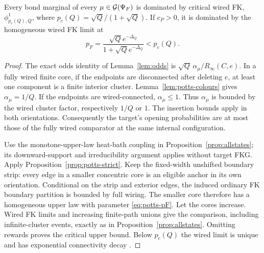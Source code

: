 \begin{proposition}\label{prop:potts-allstates}
Every bond marginal of every $\mu\in\mathcal G(\Psi_F)$ is dominated by critical wired FK, $\phi^1_{p_c(Q),Q}$, where $p_c(Q)=\sqrt Q/(1+\sqrt Q)$. If $c_P>0$, it is dominated by the homogeneous wired FK limit at
\begin{equation}\label{eq:potts-pF}
 p_F=\frac{\sqrt Q e^{-\Delta_Q}}{1+\sqrt Q e^{-\Delta_Q}}<p_c(Q).
\end{equation}
\end{proposition}
\begin{proof}
The exact odds identity of Lemma~\ref{lem:odds} is
$\sqrt Q\,\alpha_\mu/R_\infty(C,e)$.
In a fully wired finite core, if the endpoints are disconnected after deleting $e$, at least one component is a finite interior cluster. Lemma~\ref{lem:potts-colours} gives $\alpha_\mu=1/Q$. If the endpoints are wired-connected, $\alpha_\mu\le1$. Thus $\alpha_\mu$ is bounded by the wired cluster factor, respectively $1/Q$ or $1$. The insertion bounds apply in both orientations. Consequently the target's opening probabilities are at most those of the fully wired comparator at the same internal configuration.

Use the monotone-upper-law heat-bath coupling in Proposition~\ref{prop:allstates}; its downward-support and irreducibility argument applies without target FKG. Apply Proposition~\ref{prop:potts-strict}. Keep the fixed-width unshifted boundary strip: every edge in a smaller concentric core is an eligible anchor in its own orientation. Conditional on the strip and exterior edges, the induced ordinary FK boundary partition is bounded by full wiring. The smaller core therefore has a homogeneous upper law with parameter \eqref{eq:potts-pF}. Let the cores increase. Wired FK limits and increasing finite-path unions give the comparison, including infinite-cluster events, exactly as in Proposition~\ref{prop:allstates}. Omitting rewards proves the critical upper bound. Below $p_c(Q)$ the wired limit is unique and has exponential connectivity decay \cite[Theorems 1 and 2]{BDC}.
\end{proof}

